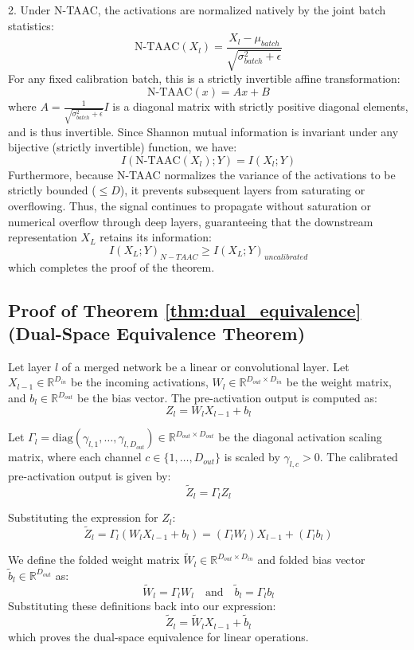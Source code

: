 \documentclass{article}
\theoremstyle{plain}
\theoremstyle{definition}
\theoremstyle{remark}
\begin{document}
2. Under N-TAAC, the activations are normalized natively by the joint batch statistics:
$$\text{N-TAAC}(X_l) = \frac{X_l - \mu_{batch}}{\sqrt{\sigma_{batch}^2 + \epsilon}}$$
For any fixed calibration batch, this is a strictly invertible affine transformation:
$$\text{N-TAAC}(x) = A x + B$$
where $A = \frac{1}{\sqrt{\sigma_{batch}^2 + \epsilon}} I$ is a diagonal matrix with strictly positive diagonal elements, and is thus invertible.
Since Shannon mutual information is invariant under any bijective (strictly invertible) function, we have:
$$I(\text{N-TAAC}(X_l); Y) = I(X_l; Y)$$
Furthermore, because N-TAAC normalizes the variance of the activations to be strictly bounded ($\le D$), it prevents subsequent layers from saturating or overflowing.
Thus, the signal continues to propagate without saturation or numerical overflow through deep layers, guaranteeing that the downstream representation $X_L$ retains its information:
$$I(X_L; Y)_{N-TAAC} \ge I(X_L; Y)_{uncalibrated}$$
which completes the proof of the theorem.

\subsection{Proof of Theorem \ref{thm:dual_equivalence} (Dual-Space Equivalence Theorem)}
Let layer $l$ of a merged network be a linear or convolutional layer. Let $X_{l-1} \in \mathbb{R}^{D_{in}}$ be the incoming activations, $W_l \in \mathbb{R}^{D_{out} \times D_{in}}$ be the weight matrix, and $b_l \in \mathbb{R}^{D_{out}}$ be the bias vector.
The pre-activation output is computed as:
$$Z_l = W_l X_{l-1} + b_l$$

Let $\Gamma_l = \text{diag}(\gamma_{l,1}, \dots, \gamma_{l,D_{out}}) \in \mathbb{R}^{D_{out} \times D_{out}}$ be the diagonal activation scaling matrix, where each channel $c \in \{1, \dots, D_{out}\}$ is scaled by $\gamma_{l,c} > 0$.
The calibrated pre-activation output is given by:
$$\widetilde{Z}_l = \Gamma_l Z_l$$

Substituting the expression for $Z_l$:
$$\widetilde{Z}_l = \Gamma_l \left( W_l X_{l-1} + b_l \right) = \left( \Gamma_l W_l \right) X_{l-1} + \left( \Gamma_l b_l \right)$$

We define the folded weight matrix $\widetilde{W}_l \in \mathbb{R}^{D_{out} \times D_{in}}$ and folded bias vector $\widetilde{b}_l \in \mathbb{R}^{D_{out}}$ as:
$$\widetilde{W}_l = \Gamma_l W_l \quad \text{and} \quad \widetilde{b}_l = \Gamma_l b_l$$
Substituting these definitions back into our expression:
$$\widetilde{Z}_l = \widetilde{W}_l X_{l-1} + \widetilde{b}_l$$
which proves the dual-space equivalence for linear operations.
\end{document}
